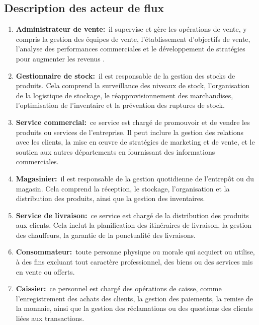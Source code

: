 \documentclass[edit,12pt,a4paper,ChapStyle,oneside,doubleinterligne]{report}
\begin{document}
\subsection{Description des acteur de flux}
\begin{enumerate}
    \item\textbf{Administrateur de vente:}~il supervise et gère les opérations de vente, y compris la gestion des équipes de vente, l'établissement d'objectifs de vente, l'analyse des performances commerciales et le développement de stratégies pour augmenter les revenus \cite{Administrateur}.
    \item\textbf{Gestionnaire de stock:}~il est responsable de la gestion des stocks de produits. Cela comprend la surveillance des niveaux de stock, l'organisation de la logistique de stockage, le réapprovisionnement des marchandises, l'optimisation de l'inventaire et la prévention des ruptures de stock\cite{Gestionnaire}.
    \item\textbf{Service commercial:}~ce service est chargé de promouvoir et de vendre les produits ou services de l'entreprise. Il peut inclure la gestion des relations avec les clients, la mise en œuvre de stratégies de marketing et de vente, et le soutien aux autres départements en fournissant des informations commerciales\cite{Service}.
    \item\textbf{Magasinier:}~il est responsable de la gestion quotidienne de l'entrepôt ou du magasin. Cela comprend la réception, le stockage, l'organisation et la distribution des produits, ainsi que la gestion des inventaires\cite{Magasinier}.
    \item\textbf{Service de livraison:}~ce service est chargé de la distribution des produits aux clients. Cela inclut la planification des itinéraires de livraison, la gestion des chauffeurs, la garantie de la ponctualité des livraisons\cite{logistique}.
    \item\textbf{Consommateur:}~toute personne physique ou morale qui acquiert ou utilise, à des fins excluant tout caractère professionnel, des biens ou des services mis en vente ou offerts\cite{Consommateur}.
    \item \textbf{Caissier:}~ce personnel est chargé des opérations de caisse, comme l'enregistrement des achats des clients, la gestion des paiements, la remise de la monnaie, ainsi que la gestion des réclamations ou des questions des clients liées aux transactions\cite{Personnel}.
\end{enumerate}
\end{document}

